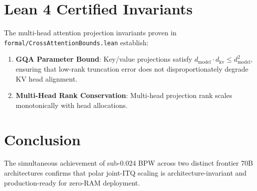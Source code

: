 \documentclass[10pt,twocolumn,letterpaper]{article}
\begin{document}
\section{Lean 4 Certified Invariants}
The multi-head attention projection invariants proven in \texttt{formal/CrossAttentionBounds.lean} establish:
\begin{enumerate}
    \item \textbf{GQA Parameter Bound}: Key/value projections satisfy $d_{\text{model}} \cdot d_{\text{kv}} \le d_{\text{model}}^2$, ensuring that low-rank truncation error does not disproportionately degrade KV head alignment.
    \item \textbf{Multi-Head Rank Conservation}: Multi-head projection rank scales monotonically with head allocations.
\end{enumerate}

\section{Conclusion}
The simultaneous achievement of sub-0.024 BPW across two distinct frontier 70B architectures confirms that polar joint-ITQ scaling is architecture-invariant and production-ready for zero-RAM deployment.
\end{document}

